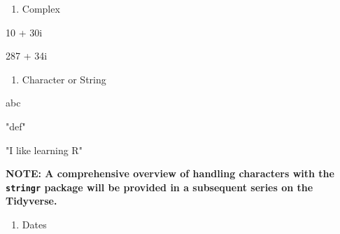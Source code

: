 \documentclass[
  letterpaper,
  DIV=11,
  numbers=noendperiod]{scrreprt}
\newenvironment{Shaded}{}{}
\newcommand{\DecValTok}[1]{\textcolor[rgb]{0.00,0.36,0.77}{#1}}
\newcommand{\NormalTok}[1]{\textcolor[rgb]{0.14,0.16,0.18}{#1}}
\newcommand{\SpecialCharTok}[1]{\textcolor[rgb]{0.00,0.36,0.77}{#1}}
\newcommand{\StringTok}[1]{\textcolor[rgb]{0.01,0.18,0.38}{#1}}
\providecommand{\tightlist}{%
  \setlength{\itemsep}{0pt}\setlength{\parskip}{0pt}}\usepackage{longtable,booktabs,array}
\begin{document}
\begin{enumerate}
\def\labelenumi{\arabic{enumi}.}
\setcounter{enumi}{3}
\tightlist
\item
  Complex
\end{enumerate}

\begin{Shaded}
\begin{Highlighting}[]
\DecValTok{10} \SpecialCharTok{+} \DecValTok{30}\NormalTok{i}
\end{Highlighting}
\end{Shaded}

\begin{Shaded}
\begin{Highlighting}[]
\DecValTok{287} \SpecialCharTok{+} \DecValTok{34}\NormalTok{i}
\end{Highlighting}
\end{Shaded}

\begin{enumerate}
\def\labelenumi{\arabic{enumi}.}
\setcounter{enumi}{4}
\tightlist
\item
  Character or String
\end{enumerate}

\begin{Shaded}
\begin{Highlighting}[]
\StringTok{\textquotesingle{}abc\textquotesingle{}}
\end{Highlighting}
\end{Shaded}

\begin{Shaded}
\begin{Highlighting}[]
\StringTok{"def"}
\end{Highlighting}
\end{Shaded}

\begin{Shaded}
\begin{Highlighting}[]
\StringTok{"I like learning R"}
\end{Highlighting}
\end{Shaded}

\textbf{NOTE: A comprehensive overview of handling characters with the
\texttt{stringr} package will be provided in a subsequent series on the
Tidyverse.}

\begin{enumerate}
\def\labelenumi{\arabic{enumi}.}
\setcounter{enumi}{5}
\tightlist
\item
  Dates
\end{enumerate}
\end{document}
